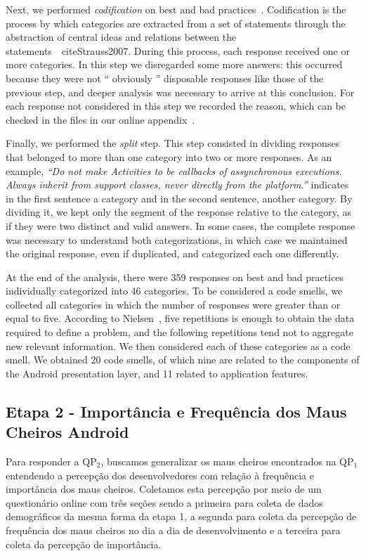 Next, we performed \textit{codification} on best and bad practices~\cite{Strauss2007, Saldana2013}. Codification is the process by which categories are extracted from a set of statements through the abstraction of central ideas and relations between the statements~\ cite{Strauss2007}. During this process, each response received one or more categories. In this step we disregarded some more answers: this occurred because they were not `` obviously '' disposable responses like those of the previous step, and deeper analysis was necessary to arrive at this conclusion. For each response not considered in this step we recorded the reason, which can be checked in the files in our online appendix~\cite{apendice}.

Finally, we performed the \textit {split} step. This step consisted in dividing responses that belonged to more than one category into two or more responses.
As an example, \textit{``Do not make Activities to be callbacks of assynchronous executions. Always inherit from support classes, never directly from the platform.''} indicates in the first sentence a category and in the second sentence, another category. By dividing it, we kept only the segment of the response relative to the category, as if they were two distinct and valid answers. In some cases, the complete response was necessary to understand both categorizations, in which case we maintained the original response, even if duplicated, and categorized each one differently.

At the end of the analysis, there were 359 responses on best and bad practices individually categorized into 46 categories. 
To be considered a code smells, we collected all categories in which the number
of responses were greater than or equal to five.
According to Nielsen~\cite{NielsenMagicNumber:00}, five repetitions is enough to obtain the data required to define a problem, and the following repetitions tend not to aggregate new relevant information. We then considered each of these categories as a code smell.
We obtained 20 code smells, of which nine are related to the components of the Android presentation layer, and 11 related to application features.

\subsection{Etapa 2 - Importância e Frequência dos Maus Cheiros Android}



Para responder a QP$_2$, buscamos generalizar os maus cheiros encontrados na QP$_1$ entendendo a percepção dos desenvolvedores com relação à frequência e importância dos maus cheiros. Coletamos esta percepção por meio de um questionário online com três seções sendo a primeira para coleta de dados demográficos da mesma forma da etapa 1, a segunda para coleta da percepção de frequência dos maus cheiros no dia a dia de desenvolvimento e a terceira para coleta da percepção de importância. 

